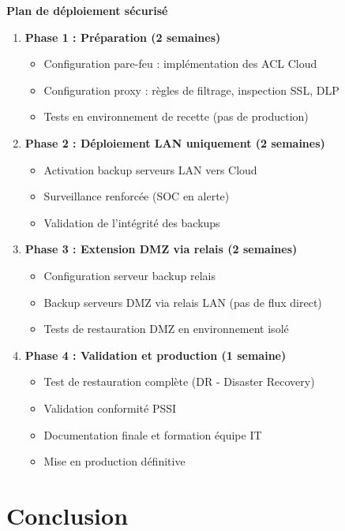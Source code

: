 \noindent \textbf{Plan de déploiement sécurisé}

\begin{enumerate}
  \item \textbf{Phase 1 : Préparation (2 semaines)}
  \begin{itemize}
    \item Configuration pare-feu : implémentation des ACL Cloud
    \item Configuration proxy : règles de filtrage, inspection SSL, DLP
    \item Tests en environnement de recette (pas de production)
  \end{itemize}
  
  \item \textbf{Phase 2 : Déploiement LAN uniquement (2 semaines)}
  \begin{itemize}
    \item Activation backup serveurs LAN vers Cloud
    \item Surveillance renforcée (SOC en alerte)
    \item Validation de l'intégrité des backups
  \end{itemize}
  
  \item \textbf{Phase 3 : Extension DMZ via relais (2 semaines)}
  \begin{itemize}
    \item Configuration serveur backup relais
    \item Backup serveurs DMZ via relais LAN (pas de flux direct)
    \item Tests de restauration DMZ en environnement isolé
  \end{itemize}
  
  \item \textbf{Phase 4 : Validation et production (1 semaine)}
  \begin{itemize}
    \item Test de restauration complète (DR - Disaster Recovery)
    \item Validation conformité PSSI
    \item Documentation finale et formation équipe IT
    \item Mise en production définitive
  \end{itemize}
\end{enumerate}

\medskip

\section*{Conclusion}

